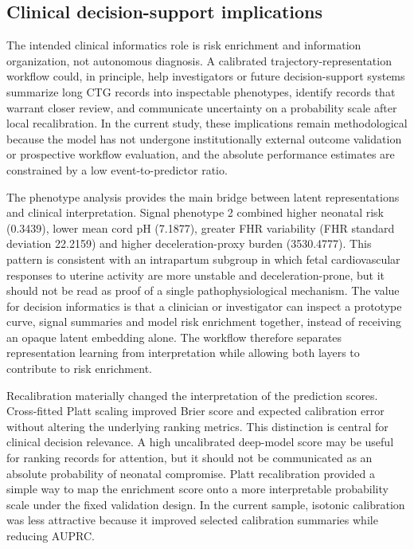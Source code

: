 \documentclass[utf8]{FrontiersinHarvard}
\begin{document}
\subsection{Clinical decision-support implications}

The intended clinical informatics role is risk enrichment and information organization, not autonomous diagnosis. A calibrated trajectory-representation workflow could, in principle, help investigators or future decision-support systems summarize long CTG records into inspectable phenotypes, identify records that warrant closer review, and communicate uncertainty on a probability scale after local recalibration. In the current study, these implications remain methodological because the model has not undergone institutionally external outcome validation or prospective workflow evaluation, and the absolute performance estimates are constrained by a low event-to-predictor ratio.

The phenotype analysis provides the main bridge between latent representations and clinical interpretation. Signal phenotype 2 combined higher neonatal risk (0.3439), lower mean cord pH (7.1877), greater FHR variability (FHR standard deviation 22.2159) and higher deceleration-proxy burden (3530.4777). This pattern is consistent with an intrapartum subgroup in which fetal cardiovascular responses to uterine activity are more unstable and deceleration-prone, but it should not be read as proof of a single pathophysiological mechanism. The value for decision informatics is that a clinician or investigator can inspect a prototype curve, signal summaries and model risk enrichment together, instead of receiving an opaque latent embedding alone. The workflow therefore separates representation learning from interpretation while allowing both layers to contribute to risk enrichment.

Recalibration materially changed the interpretation of the prediction scores. Cross-fitted Platt scaling improved Brier score and expected calibration error without altering the underlying ranking metrics. This distinction is central for clinical decision relevance. A high uncalibrated deep-model score may be useful for ranking records for attention, but it should not be communicated as an absolute probability of neonatal compromise. Platt recalibration provided a simple way to map the enrichment score onto a more interpretable probability scale under the fixed validation design. In the current sample, isotonic calibration was less attractive because it improved selected calibration summaries while reducing AUPRC.
\end{document}
